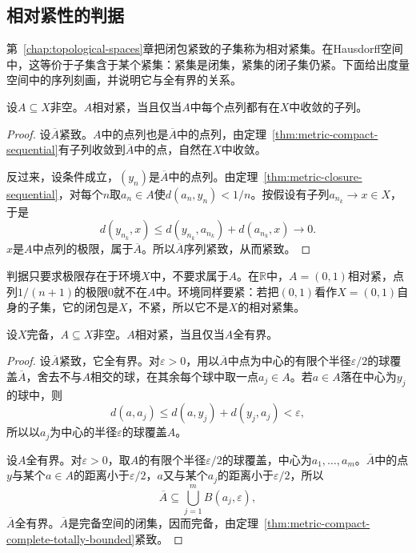 \subsection{相对紧性的判据}
\label{sec:metric-relative-compactness}

第~\ref{chap:topological-spaces}章把闭包紧致的子集称为相对紧集。在Hausdorff空间中，这等价于子集含于某个紧集：紧集是闭集，紧集的闭子集仍紧。下面给出度量空间中的序列刻画，并说明它与全有界的关系。

\begin{theorem}[相对紧的序列判据]
\label{thm:metric-relatively-compact-sequential}
设$A\subseteq X$非空。$A$相对紧，当且仅当$A$中每个点列都有在$X$中收敛的子列。
\end{theorem}

\begin{proof}
设$\overline A$紧致。$A$中的点列也是$\overline A$中的点列，由定理~\ref{thm:metric-compact-sequential}有子列收敛到$\overline A$中的点，自然在$X$中收敛。

反过来，设条件成立，$(y_n)$是$\overline A$中的点列。由定理~\ref{thm:metric-closure-sequential}，对每个$n$取$a_n\in A$使$d(a_n,y_n)<1/n$。按假设有子列$a_{n_k}\to x\in X$，于是
\[
d(y_{n_k},x)\leq d(y_{n_k},a_{n_k})+d(a_{n_k},x)\to0.
\]
$x$是$A$中点列的极限，属于$\overline A$。所以$\overline A$序列紧致，从而紧致。
\end{proof}

判据只要求极限存在于环境$X$中，不要求属于$A$。在$\mathbb R$中，$A=(0,1)$相对紧，点列$1/(n+1)$的极限$0$就不在$A$中。环境同样要紧：若把$(0,1)$看作$X=(0,1)$自身的子集，它的闭包是$X$，不紧，所以它不是$X$的相对紧集。

\begin{theorem}[完备空间中的相对紧集]
\label{thm:metric-relatively-compact-totally-bounded}
设$X$完备，$A\subseteq X$非空。$A$相对紧，当且仅当$A$全有界。
\end{theorem}

\begin{proof}
设$\overline A$紧致，它全有界。对$\varepsilon>0$，用以$\overline A$中点为中心的有限个半径$\varepsilon/2$的球覆盖$\overline A$，舍去不与$A$相交的球，在其余每个球中取一点$a_j\in A$。若$a\in A$落在中心为$y_j$的球中，则
\[
d(a,a_j)\leq d(a,y_j)+d(y_j,a_j)<\varepsilon,
\]
所以以$a_j$为中心的半径$\varepsilon$的球覆盖$A$。

设$A$全有界。对$\varepsilon>0$，取$A$的有限个半径$\varepsilon/2$的球覆盖，中心为$a_1,\ldots,a_m$。$\overline A$中的点$y$与某个$a\in A$的距离小于$\varepsilon/2$，$a$又与某个$a_j$的距离小于$\varepsilon/2$，所以
\[
\overline A\subseteq\bigcup_{j=1}^mB(a_j,\varepsilon),
\]
$\overline A$全有界。$\overline A$是完备空间的闭集，因而完备，由定理~\ref{thm:metric-compact-complete-totally-bounded}紧致。
\end{proof}


